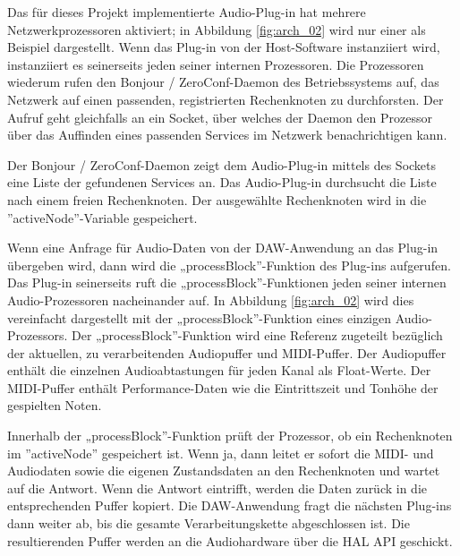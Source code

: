 Das für dieses Projekt implementierte  Audio-Plug-in hat mehrere Netzwerkprozessoren aktiviert; in Abbildung \ref{fig:arch_02} wird nur einer als Beispiel dargestellt. Wenn das Plug-in von der Host-Software instanziiert wird, instanziiert es seinerseits jeden seiner internen Prozessoren. Die Prozessoren wiederum rufen den Bonjour / ZeroConf-Daemon des Betriebssystems auf, das Netzwerk auf einen passenden, registrierten Rechenknoten zu durchforsten. Der Aufruf geht gleichfalls an ein Socket, über welches der Daemon den Prozessor über das Auffinden eines passenden Services im Netzwerk benachrichtigen kann.

Der Bonjour / ZeroConf-Daemon zeigt dem Audio-Plug-in mittels des  Sockets eine Liste der gefundenen Services an. Das Audio-Plug-in durchsucht die Liste nach einem freien Rechenknoten. Der ausgewählte Rechenknoten wird in die ”activeNode”-Variable gespeichert.

Wenn eine Anfrage für Audio-Daten von der DAW-Anwendung an das Plug-in übergeben wird, dann wird die „processBlock”-Funktion des Plug-ins aufgerufen. Das Plug-in seinerseits ruft die „processBlock”-Funktionen jeden seiner internen Audio-Prozessoren nacheinander auf. In Abbildung \ref{fig:arch_02} wird dies vereinfacht dargestellt mit der „processBlock”-Funktion eines einzigen Audio-Prozessors. Der „processBlock”-Funktion wird eine Referenz zugeteilt bezüglich der aktuellen, zu verarbeitenden Audiopuffer und MIDI-Puffer. Der Audiopuffer enthält die einzelnen Audioabtastungen für jeden Kanal als Float-Werte. Der MIDI-Puffer enthält Performance-Daten wie die Eintrittszeit und Tonhöhe der gespielten Noten.

Innerhalb der „processBlock”-Funktion prüft der Prozessor, ob ein Rechenknoten im ”activeNode” gespeichert ist. Wenn ja, dann leitet er sofort die MIDI- und Audiodaten sowie die eigenen Zustandsdaten an den Rechenknoten und wartet auf die Antwort. Wenn die Antwort eintrifft, werden die Daten zurück in die entsprechenden Puffer kopiert. Die DAW-Anwendung fragt die nächsten Plug-ins dann weiter ab, bis die gesamte Verarbeitungskette abgeschlossen ist. Die resultierenden Puffer werden an die Audiohardware über die HAL API geschickt.